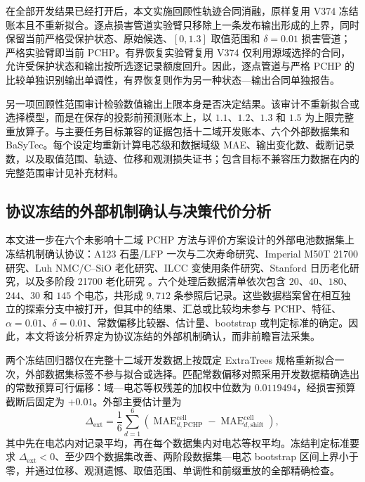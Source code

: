 \documentclass[UTF8,11pt]{ctexart}
\begin{document}
在全部开发结果已经打开后，本文实施回顾性轨迹合同消融，原样复用 V374 冻结账本且不重新拟合。逐点损害管道实验臂只移除上一条发布输出形成的上界，同时保留当前严格受保护状态、原始候选、$[0,1.3]$ 取值范围和 $\delta=0.01$ 损害管道；严格实验臂即当前 PCHP。有界恢复实验臂复用 V374 仅利用源域选择的合同，允许受保护状态和输出按所选逐记录额度回升。因此，逐点管道与严格 PCHP 的比较单独识别输出单调性，有界恢复则作为另一种状态—输出合同单独报告。

另一项回顾性范围审计检验数值输出上限本身是否决定结果。该审计不重新拟合或选择模型，而是在保存的投影前预测账本上，以 $1.1$、$1.2$、$1.3$ 和 $1.5$ 为上限完整重放算子。与主要任务目标兼容的证据包括十二域开发账本、六个外部数据集和 BaSyTec。每个设定均重新计算电芯级和数据域级 MAE、输出变化数、截断记录数，以及取值范围、轨迹、位移和观测损失证书；包含目标不兼容压力数据在内的完整范围审计见补充材料。

\subsection{协议冻结的外部机制确认与决策代价分析}

本文进一步在六个未影响十二域 PCHP 方法与评价方案设计的外部电池数据集上冻结机制确认协议：A123 石墨/LFP 一次与二次寿命研究、Imperial M50T 21700 研究、Luh NMC/C--SiO 老化研究、ILCC 变使用条件研究、Stanford 日历老化研究，以及多阶段 21700 老化研究 \citep{wheeler2025lfp,kirkaldy2024comprehensive,luh2024dataset,li2024varyingusage,lam2025calendar,stroebl2024multistage}。六个处理后数据清单依次包含 $20$、$40$、$180$、$244$、$30$ 和 $145$ 个电芯，共形成 $9{,}712$ 条参照后记录。这些数据档案曾在相互独立的探索分支中被打开，但其中的结果、汇总或比较均未参与 PCHP、特征、$\alpha=0.01$、$\delta=0.01$、常数偏移比较器、估计量、bootstrap 或判定标准的确定。因此，本文将该分析界定为协议冻结的外部机制确认，而非前瞻盲法采集。

两个冻结回归器仅在完整十二域开发数据上按既定 ExtraTrees 规格重新拟合一次，外部数据集标签不参与拟合或选择。匹配常数偏移对照采用开发数据精确选出的常数预算可行偏移：域—电芯等权残差的加权中位数为 $0.0119494$，经损害预算截断后固定为 $+0.01$。外部主要估计量为
\begin{equation}
\Delta_{\mathrm{ext}}=\frac{1}{6}\sum_{d=1}^{6}
\left(\operatorname{MAE}^{\mathrm{cell}}_{d,\mathrm{PCHP}}-
\operatorname{MAE}^{\mathrm{cell}}_{d,\mathrm{shift}}\right),
\label{eq:external_estimand_zh}
\end{equation}
其中先在电芯内对记录平均，再在每个数据集内对电芯等权平均。冻结判定标准要求 $\Delta_{\mathrm{ext}}<0$、至少四个数据集改善、两阶段数据集—电芯 bootstrap 区间上界小于零，并通过位移、观测遗憾、取值范围、单调性和前缀重放的全部精确检查。
\end{document}
